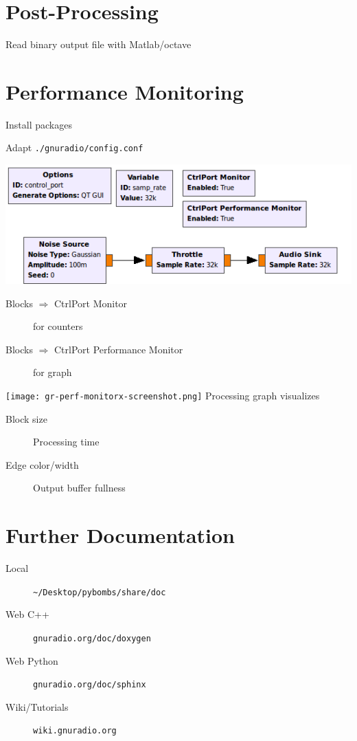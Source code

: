 \documentclass[10pt]{article}
\begin{document}
\begin{multicols*}{3}
\section*{Post-Processing}
Read binary output file with Matlab/octave


\section*{Performance Monitoring}
Install packages

Adapt \verb|./gnuradio/config.conf|


\includegraphics[width=0.99\linewidth]{control-port.png}
\begin{description}
\item[Blocks $\Rightarrow$ CtrlPort Monitor] for counters
\item[Blocks $\Rightarrow$ CtrlPort Performance Monitor] for graph
\end{description}

\texttt{[image: gr-perf-monitorx-screenshot.png]}
Processing graph visualizes
\begin{description}
\item[Block size] Processing time
\item[Edge color/width] Output buffer fullness
\end{description}

\section*{Further Documentation}
\begin{description}
\item[Local] \verb|~/Desktop/pybombs/share/doc|
\item[Web C++] \verb|gnuradio.org/doc/doxygen|
\item[Web Python] \verb|gnuradio.org/doc/sphinx|
\item[Wiki/Tutorials] \verb|wiki.gnuradio.org|
\end{description}


\end{multicols*}
\end{document}
